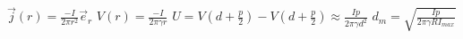 \begin{solution}
\begin{questions}

    \question $\vec j(r) = \frac{-I}{2\pi r^2} \vec{e}_r$
    \question $V(r) = \frac{-I}{2\pi \gamma  r} $
    \question $U = V(d+\frac{p}{2}) - V(d+\frac{p}{2}) \approx \frac{Ip}{2\pi \gamma d^2} $
    \question $d_m = \sqrt{\frac{Ip}{2\pi \gamma R I_{max} }}$
    
\end{questions}
\end{solution}

